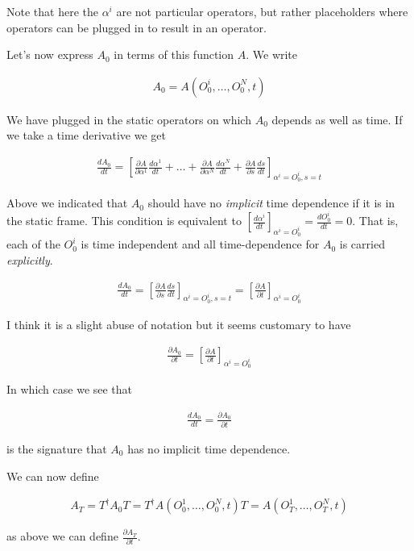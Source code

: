 \documentclass[12pt]{article}
\newcommand{\ddt}[1]{\frac{d #1}{dt}}
\newcommand{\ppt}[1]{\frac{\partial #1}{\partial t}}
\begin{document}
Note that here the $\alpha^i$ are not particular operators, but rather placeholders where operators can be plugged in to result in an operator. 

Let's now express $A_0$ in terms of this function $A$.
We write

\begin{align}
A_0 = A(O_0^i, \ldots, O_0^N, t)
\end{align}

We have plugged in the static operators on which $A_0$ depends as well as time.
If we take a time derivative we get

\begin{align}
\ddt{A_0} = \left[\frac{\partial A}{\partial \alpha^1} \ddt{\alpha^1}+\ldots+\frac{\partial A}{\partial \alpha^N} \ddt{\alpha^N} + \frac{\partial{A}}{\partial s}\ddt{s}\right]_{\alpha^i = O^i_0,s = t}
\end{align}

Above we indicated that $A_0$ should have no \textit{implicit} time dependence if it is in the static frame. This condition is equivalent to $\left[\ddt{\alpha^i}\right]_{\alpha^i=O^i_0} = \ddt{O^i_0}= 0$. That is, each of the $O^i_0$ is time independent and all time-dependence for $A_0$ is carried \textit{explicitly}.

\begin{align}
\ddt{A_0} = \left[\frac{\partial A}{\partial s} \ddt{s} \right]_{\alpha^i=O_0^i,s=t} = \left[\ppt{A}\right]_{\alpha^i=O_0^i}
\end{align}

I think it is a slight abuse of notation but it seems customary to have

\begin{align}
\ppt{A_0} = \left[\ppt{A} \right]_{\alpha^i=O^i_0}
\end{align}

In which case we see that

\begin{align}
\ddt{A_0} = \ppt{A_0}
\end{align}

is the signature that $A_0$ has no implicit time dependence.

We can now define 

\begin{align}
A_T = T^{\dag} A_0 T = T^{\dag} A(O_0^1,\ldots,O_0^N,t) T = A(O_T^1,\ldots, O_T^N,t)
\end{align}

as above we can define $\ppt{A_T}$.
\end{document}
